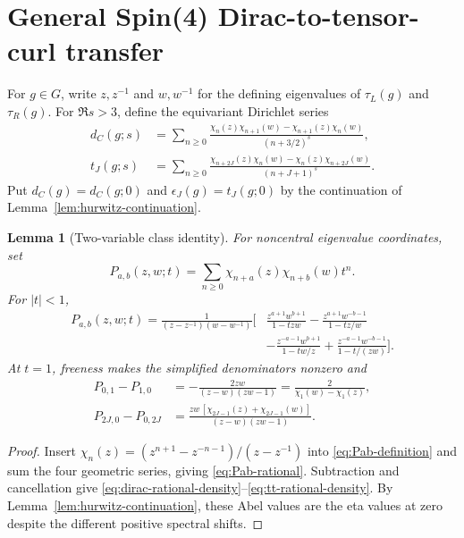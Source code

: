 \documentclass[11pt]{article}
\newtheorem{lemma}[theorem]{Lemma}
\theoremstyle{definition}
\begin{document}
\section{General Spin(4) Dirac-to-tensor-curl transfer}
\label{sec:transfer}

For $g\in G$, write $z,z^{-1}$ and $w,w^{-1}$ for the defining eigenvalues
of $\tau_L(g)$ and $\tau_R(g)$.  For $\Re s>3$, define the equivariant
Dirichlet series
\begin{align}
 d_C(g;s)&=\sum_{n\geq0}
 \frac{\chi_n(z)\chi_{n+1}(w)-\chi_{n+1}(z)\chi_n(w)}
 {(n+3/2)^s},
 \label{eq:equivariant-dirac-series}\\
 t_J(g;s)&=\sum_{n\geq0}
 \frac{\chi_{n+2J}(z)\chi_n(w)-\chi_n(z)\chi_{n+2J}(w)}
 {(n+J+1)^s}.
 \label{eq:equivariant-tt-series}
\end{align}
Put $d_C(g)=d_C(g;0)$ and $\epsilon_J(g)=t_J(g;0)$ by the continuation of
Lemma~\ref{lem:hurwitz-continuation}.

\begin{lemma}[Two-variable class identity]
\label{lem:two-variable-identity}
For noncentral eigenvalue coordinates, set
\begin{equation}
 P_{a,b}(z,w;t)=\sum_{n\geq0}\chi_{n+a}(z)\chi_{n+b}(w)t^n.
 \label{eq:Pab-definition}
\end{equation}
For $|t|<1$,
\begin{align}
 P_{a,b}(z,w;t)=\frac1{(z-z^{-1})(w-w^{-1})}\bigg[&
 \frac{z^{a+1}w^{b+1}}{1-tzw}
 -\frac{z^{a+1}w^{-b-1}}{1-tz/w}\nonumber\\
 &-\frac{z^{-a-1}w^{b+1}}{1-tw/z}
 +\frac{z^{-a-1}w^{-b-1}}{1-t/(zw)}\bigg].
 \label{eq:Pab-rational}
\end{align}
At $t=1$, freeness makes the simplified denominators nonzero and
\begin{align}
 P_{0,1}-P_{1,0}
 &=-\frac{2zw}{(z-w)(zw-1)}
 =\frac{2}{\chi_1(w)-\chi_1(z)},
 \label{eq:dirac-rational-density}\\
 P_{2J,0}-P_{0,2J}
 &=\frac{zw\,[\chi_{2J-1}(z)+\chi_{2J-1}(w)]}
 {(z-w)(zw-1)}.
 \label{eq:tt-rational-density}
\end{align}
\end{lemma}

\begin{proof}
Insert
$\chi_n(z)=(z^{n+1}-z^{-n-1})/(z-z^{-1})$ into
\eqref{eq:Pab-definition} and sum the four geometric series, giving
\eqref{eq:Pab-rational}.  Subtraction and cancellation give
\eqref{eq:dirac-rational-density}--\eqref{eq:tt-rational-density}.  By
Lemma~\ref{lem:hurwitz-continuation}, these Abel values are the eta values at
zero despite the different positive spectral shifts.
\end{proof}
\end{document}
